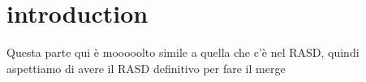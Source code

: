 \chapter{introduction}

{\color{red} Questa parte qui è mooooolto simile a quella che c'è nel RASD, quindi aspettiamo di avere il RASD definitivo per fare il merge}